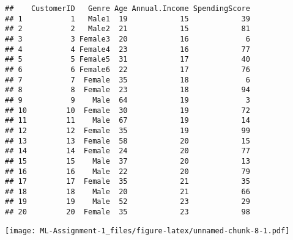 \documentclass[
]{article}
\newenvironment{Shaded}{\begin{snugshade}}{\end{snugshade}}
\newcommand{\AttributeTok}[1]{\textcolor[rgb]{0.77,0.63,0.00}{#1}}
\newcommand{\FunctionTok}[1]{\textcolor[rgb]{0.00,0.00,0.00}{#1}}
\newcommand{\NormalTok}[1]{#1}
\newcommand{\StringTok}[1]{\textcolor[rgb]{0.31,0.60,0.02}{#1}}
\begin{document}
\begin{verbatim}
##    CustomerID   Genre Age Annual.Income SpendingScore
## 1           1   Male1  19            15            39
## 2           2   Male2  21            15            81
## 3           3 Female3  20            16             6
## 4           4 Female4  23            16            77
## 5           5 Female5  31            17            40
## 6           6 Female6  22            17            76
## 7           7  Female  35            18             6
## 8           8  Female  23            18            94
## 9           9    Male  64            19             3
## 10         10  Female  30            19            72
## 11         11    Male  67            19            14
## 12         12  Female  35            19            99
## 13         13  Female  58            20            15
## 14         14  Female  24            20            77
## 15         15    Male  37            20            13
## 16         16    Male  22            20            79
## 17         17  Female  35            21            35
## 18         18    Male  20            21            66
## 19         19    Male  52            23            29
## 20         20  Female  35            23            98
\end{verbatim}

\begin{Shaded}
\end{Shaded}

\texttt{[image: ML-Assignment-1\_files/figure-latex/unnamed-chunk-8-1.pdf]}
\end{document}
